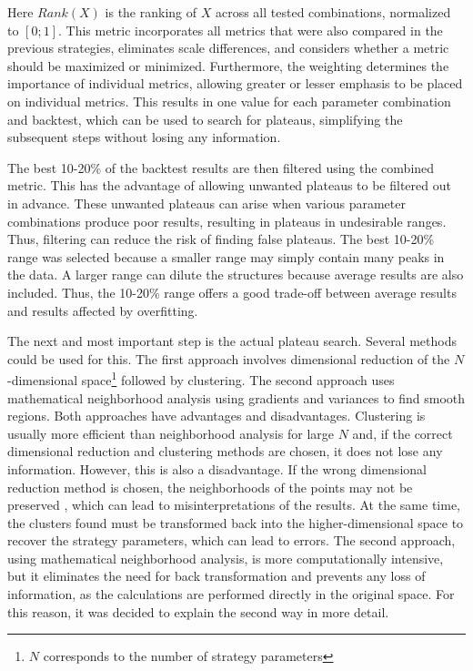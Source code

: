 \noindent
Here $Rank(X)$ is the ranking of $X$ across all tested combinations, normalized to $[0; 1]$.
This metric incorporates all metrics that were also compared in the previous strategies, eliminates scale differences, and considers whether a metric should be maximized or minimized.
Furthermore, the weighting determines the importance of individual metrics, allowing greater or lesser emphasis to be placed on individual metrics.
This results in one value for each parameter combination and backtest, which can be used to search for plateaus, simplifying the subsequent steps without losing any information.

The best 10-20\% of the backtest results are then filtered using the combined metric.
This has the advantage of allowing unwanted plateaus to be filtered out in advance.
These unwanted plateaus can arise when various parameter combinations produce poor results, resulting in plateaus in undesirable ranges.
Thus, filtering can reduce the risk of finding false plateaus.
The best 10-20\% range was selected because a smaller range may simply contain many peaks in the data.
A larger range can dilute the structures because average results are also included.
Thus, the 10-20\% range offers a good trade-off between average results and results affected by overfitting.

The next and most important step is the actual plateau search.
Several methods could be used for this.
The first approach involves dimensional reduction of the $N$-dimensional space\footnote{$N$ corresponds to the number of strategy parameters} followed by clustering.
The second approach uses mathematical neighborhood analysis using gradients and variances to find smooth regions.
Both approaches have advantages and disadvantages.
Clustering is usually more efficient than neighborhood analysis for large $N$ \cite{cluster-neighbors} and, if the correct dimensional reduction and clustering methods are chosen, it does not lose any information.
However, this is also a disadvantage.
If the wrong dimensional reduction method is chosen, the neighborhoods of the points may not be preserved \cite{cluster-neighbors}, which can lead to misinterpretations of the results.
At the same time, the clusters found must be transformed back into the higher-dimensional space to recover the strategy parameters, which can lead to errors.
The second approach, using mathematical neighborhood analysis, is more computationally intensive, but it eliminates the need for back transformation and prevents any loss of information, as the calculations are performed directly in the original space.
For this reason, it was decided to explain the second way in more detail.

